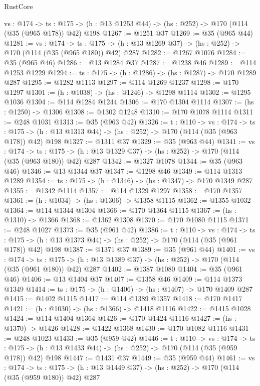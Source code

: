 \begin{lexlean}{RustCore}
\begin{coremodule}
  {vs : @174} ->
  {ts : @175} -> (h : @13 @1253 @44) -> (hs : @252) -> @170 (@114 (@35 (@965 @178)) @42) @198
@1267 := @1251 @37
@1269 := @35 (@965 @44)
@1281 := {vs : @174} ->
  {ts : @175} -> (h : @13 @1269 @37) -> (hs : @252) -> @170 (@114 (@35 (@965 @180)) @42) @287
@1282 := @1267 @1076
@1284 := @35 (@965 @46)
@1286 := @13 @1284 @37
@1287 := @1238 @46
@1289 := @114 @1253 @1229
@1294 := {ts : @175} -> (h : @1286) -> (hs : @1287) -> @170 @1289 @287
@1295 := @1282 @1113
@1297 := @114 @1269 @1237
@1298 := @170 @1297
@1301 := (h : @1038) -> (hs : @1246) -> @1298 @1114
@1302 := @1295 @1036
@1304 := @114 @1284 @1244
@1306 := @170 @1304 @1114
@1307 := (hs : @1250) -> @1306
@1308 := @1302 @1248
@1310 := @170 @1078 @1114
@1311 := @248 @1031
@1313 := @35 (@963 @42)
@1326 := {t : @110} ->
  {vs : @174} ->
  {ts : @175} -> (h : @13 @1313 @44) -> (hs : @252) -> @170 (@114 (@35 (@963 @178)) @42) @198
@1327 := @1311 @37
@1329 := @35 (@963 @44)
@1341 := {vs : @174} ->
  {ts : @175} -> (h : @13 @1329 @37) -> (hs : @252) -> @170 (@114 (@35 (@963 @180)) @42) @287
@1342 := @1327 @1078
@1344 := @35 (@963 @46)
@1346 := @13 @1344 @37
@1347 := @1298 @46
@1349 := @114 @1313 @1289
@1354 := {ts : @175} -> (h : @1346) -> (hs : @1347) -> @170 @1349 @287
@1355 := @1342 @1114
@1357 := @114 @1329 @1297
@1358 := @170 @1357
@1361 := (h : @1034) -> (hs : @1306) -> @1358 @1115
@1362 := @1355 @1032
@1364 := @114 @1344 @1304
@1366 := @170 @1364 @1115
@1367 := (hs : @1310) -> @1366
@1368 := @1362 @1308
@1370 := @170 @1080 @1115
@1371 := @248 @1027
@1373 := @35 (@961 @42)
@1386 := {t : @110} ->
  {vs : @174} ->
  {ts : @175} -> (h : @13 @1373 @44) -> (hs : @252) -> @170 (@114 (@35 (@961 @178)) @42) @198
@1387 := @1371 @37
@1389 := @35 (@961 @44)
@1401 := {vs : @174} ->
  {ts : @175} -> (h : @13 @1389 @37) -> (hs : @252) -> @170 (@114 (@35 (@961 @180)) @42) @287
@1402 := @1387 @1080
@1404 := @35 (@961 @46)
@1406 := @13 @1404 @37
@1407 := @1358 @46
@1409 := @114 @1373 @1349
@1414 := {ts : @175} -> (h : @1406) -> (hs : @1407) -> @170 @1409 @287
@1415 := @1402 @1115
@1417 := @114 @1389 @1357
@1418 := @170 @1417
@1421 := (h : @1030) -> (hs : @1366) -> @1418 @1116
@1422 := @1415 @1028
@1424 := @114 @1404 @1364
@1426 := @170 @1424 @1116
@1427 := (hs : @1370) -> @1426
@1428 := @1422 @1368
@1430 := @170 @1082 @1116
@1431 := @248 @1023
@1433 := @35 (@959 @42)
@1446 := {t : @110} ->
  {vs : @174} ->
  {ts : @175} -> (h : @13 @1433 @44) -> (hs : @252) -> @170 (@114 (@35 (@959 @178)) @42) @198
@1447 := @1431 @37
@1449 := @35 (@959 @44)
@1461 := {vs : @174} ->
  {ts : @175} -> (h : @13 @1449 @37) -> (hs : @252) -> @170 (@114 (@35 (@959 @180)) @42) @287

\end{coremodule}
\end{lexlean}
